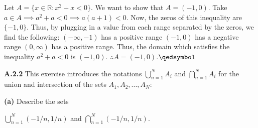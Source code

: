 \documentclass[12pt]{article}
\newcommand{\R}{\mathbb{R}}
\begin{document}
\begin{solution}\newline
Let $A = \{ x\in \R : x^2 + x < 0\}$. We want to show that $A=(-1,0)$.\newline
Take $a\in A\implies a^2+a<0\implies a(a+1)<0$.\newline
Now, the zeros of this inequality are $\{-1,0\}$.\newline
Thus, by plugging in a value from each range separated by the zeros, we find the following:\newline 
$(-\infty,-1)$ has a positive range\newline
$(-1,0)$ has a negative range\newline
$(0,\infty)$ has a positive range.\newline
Thus, the domain which satisfies the inequality $a^2+a<0$ is $(-1,0)$.\newline
$\therefore A= (-1,0)$.\flushright$\qedsymbol$
\end{solution}
\newpage
\begin{problem}
\textbf{A.2.2} This exercise introduces the notations $\bigcup_{n=1}^N A_i$ and $\bigcap_{n=1}^N A_i$ for the union and intersection of the sets $A_1, A_2, ..., A_N:$
\end{problem}
\begin{subproblem}\textbf{(a)}
Describe the sets\newline
\begin{center}
$\displaystyle\bigcup_{n=1}^N(-1/n,1/n)$ and $\displaystyle\bigcap_{n=1}^N(-1/n,1/n)$.
\end{center}
\end{subproblem}
\end{document}
